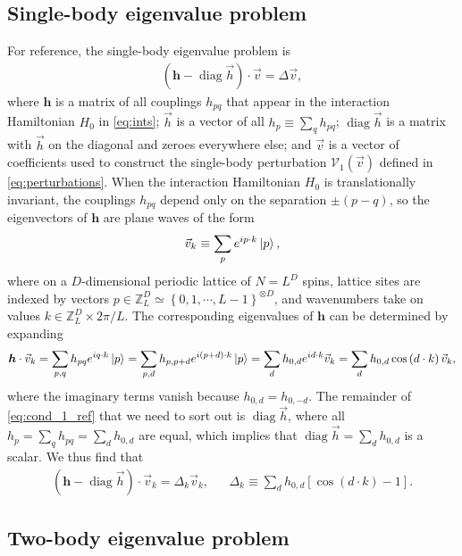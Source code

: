 \documentclass[nofootinbib,notitlepage,11pt]{revtex4-2}
\newcommand{\p}[1]{\left(#1\right)} %
\renewcommand{\sp}[1]{\left[#1\right]} %
\renewcommand{\set}[1]{\left\{#1\right\}} %
\renewcommand{\c}{\cdot} %
\newcommand{\m}{\bm} %
\renewcommand{\v}{\vec} %
\newcommand{\1}{\mathds{1}}
\newcommand{\V}{\mathcal{V}}
\newcommand{\ZZ}{\mathbb{Z}}
\DeclareMathOperator{\diag}{diag}
\begin{document}
\subsection{Single-body eigenvalue problem}
\label{sec:trans_inv_single}

For reference, the single-body eigenvalue problem is
\begin{align}
  \p{\m h - \diag\v h}\c\v v = \Delta \v v,
  \label{eq:cond_1_ref}
\end{align}
where $\m h$ is a matrix of all couplings $h_{pq}$ that appear in the
interaction Hamiltonian $H_0$ in \eqref{eq:ints}; $\v h$ is a vector
of all $h_p\equiv\sum_q h_{pq}$; $\diag\v h$ is a matrix with $\v h$
on the diagonal and zeroes everywhere else; and $\v v$ is a vector of
coefficients used to construct the single-body perturbation
$\V_1\p{\v v}$ defined in \eqref{eq:perturbations}.  When the
interaction Hamiltonian $H_0$ is translationally invariant, the
couplings $h_{pq}$ depend only on the separation $\pm\p{p-q}$, so the
eigenvectors of $\m h$ are plane waves of the form
\begin{align}
  \v v_k \equiv \sum_p e^{ip\c k} \ket{p},
\end{align}
where on a $D$-dimensional periodic lattice of $N=L^D$ spins, lattice
sites are indexed by vectors
$p\in\ZZ_L^D\simeq\set{0,1,\cdots,L-1}^{\otimes D}$, and wavenumbers
take on values $k\in\ZZ_L^D\times2\pi/L$.  The corresponding
eigenvalues of $\m h$ can be determined by expanding
\begin{align}
  \m h\c\v v_k = \sum_{p,q} h_{pq} e^{iq\c k} \ket{p}
  = \sum_{p,d} h_{p,p+d} e^{i\p{p+d}\c k} \ket{p}
  = \sum_d h_{0,d} e^{id\c k} \v v_k
  = \sum_d h_{0,d} \cos\p{d\c k} \v v_k,
\end{align}
where the imaginary terms vanish because $h_{0,d}=h_{0,-d}$.  The
remainder of \eqref{eq:cond_1_ref} that we need to sort out is
$\diag\v h$, where all $h_p=\sum_qh_{pq}=\sum_dh_{0,d}$ are equal,
which implies that $\diag\v h=\sum_dh_{0,d}$ is a scalar.  We thus
find that
\begin{align}
  \p{\m h - \diag\v h}\c\v v_k = \Delta_k \v v_k,
  &&
  \Delta_k \equiv \sum_d h_{0,d} \sp{\cos\p{d\c k}-1}.
\end{align}

\subsection{Two-body eigenvalue problem}
\label{sec:trans_inv_two}
\end{document}
